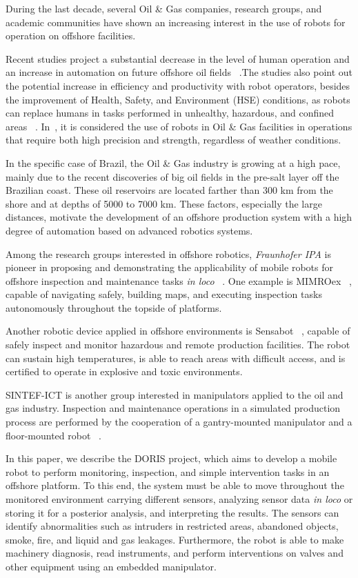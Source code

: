 \documentclass{ifacconf}
\begin{document}
During the last decade, several Oil \& Gas companies, research groups, and
academic communities have shown an increasing interest in the use of robots for
operation on offshore facilities.  

Recent studies project a substantial decrease in the level of human operation
and an increase in automation on future offshore oil fields
~\cite{skourup2009robotized}.The studies also point out the potential increase
in efficiency and productivity with robot operators, besides the improvement of
Health, Safety, and Environment (HSE) conditions, as robots can replace humans
in tasks performed in unhealthy, hazardous, and confined areas ~\cite{pal}. 
In~\cite{abb}, it is considered the use of robots in Oil \& Gas facilities in
operations that require both high precision and strength, regardless of weather conditions.

In the specific case of Brazil, the Oil \& Gas industry is growing at a high
pace, mainly due to the recent discoveries of big oil fields in the pre-salt
layer off the Brazilian coast. These oil reservoirs are located farther than
300 km from the shore and at depths of 5000 to 7000 km. These factors,
especially the large distances, motivate the development of an offshore
production system with a high degree of automation based on advanced robotics
systems.

Among the research groups interested in offshore robotics, \emph{Fraunhofer
IPA} is pioneer in proposing and demonstrating the applicability of mobile
robots for offshore inspection and maintenance tasks \emph{in
loco} ~\cite{mimroex2}. One example is MIMROex ~\cite{mimroex}, capable of
navigating safely, building maps, and executing inspection tasks autonomously
throughout the topside of platforms.

Another robotic device applied in offshore environments is Sensabot
~\cite{sensabot}, capable of safely inspect and monitor hazardous and remote
production facilities. The robot can sustain high temperatures, is able to
reach areas with difficult access, and is certified to operate in explosive and
toxic environments.

SINTEF-ICT is another group interested in manipulators applied to the oil and
gas industry. Inspection and maintenance operations in a simulated production
process are performed by the cooperation of a gantry-mounted manipulator and a
floor-mounted robot ~\cite{kyrkjebo2009robotic}.

In this paper, we describe the DORIS project, which aims to develop a mobile
robot to perform monitoring, inspection, and simple intervention tasks in an
offshore platform. To this end, the system must be able to move throughout the
monitored environment carrying different sensors, analyzing sensor data
\emph{in loco} or storing it for a posterior analysis, and interpreting the
results. The sensors can identify abnormalities such as intruders in restricted
areas, abandoned objects, smoke, fire, and liquid and gas leakages.
Furthermore, the robot is able to make machinery diagnosis, read instruments,
and perform interventions on valves and other equipment using an embedded manipulator.
\end{document}
